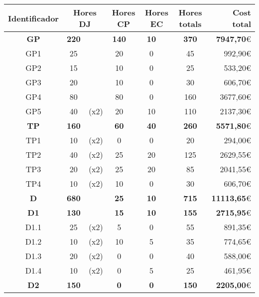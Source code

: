 \begin{table}[H]
    \centering
    \begin{tabular}{|c|cc|cc|cc|c|r|}
    \hline
    \textbf{Identificador} & \multicolumn{2}{c|}{\textbf{Hores DJ}} & \multicolumn{2}{c|}{\textbf{Hores CP}} & \multicolumn{2}{c|}{\textbf{Hores EC}} & \textbf{Hores totals}   & \textbf{Cost total}      \\ \hline
    \textbf{GP}	&	\textbf{220}	&	&	\textbf{140}	&	&	\textbf{10}	&	&	\textbf{370}	&	\textbf{7947,70}\euro	\\	\hline
    GP1	&	25	&	&	20	&	&	0	&	&	45	&	992,90\euro	\\	\hline
    GP2	&	15	&	&	10	&	&	0	&	&	25	&	533,20\euro	\\	\hline
    GP3	&	20	&	&	10	&	&	0	&	&	30	&	606,70\euro	\\	\hline
    GP4	&	80	&	&	80	&	&	0	&	&	160	&	3677,60\euro	\\	\hline
    GP5	&	40	&	{\footnotesize	(x2)}	&	20	&	&	10	&	&	110	&	2137,30\euro	\\	\hline
    \textbf{TP}	&	\textbf{160}	&	&	\textbf{60}	&	&	\textbf{40}	&	&	\textbf{260}	&	\textbf{5571,80}\euro	\\	\hline
    TP1	&	10	&	{\footnotesize	(x2)}	&	0	&	&	0	&	&	20	&	294,00\euro	\\	\hline
    TP2	&	40	&	{\footnotesize	(x2)}	&	25	&	&	20	&	&	125	&	2629,55\euro	\\	\hline
    TP3	&	20	&	{\footnotesize	(x2)}	&	25	&	&	20	&	&	85	&	2041,55\euro	\\	\hline
    TP4	&	10	&	{\footnotesize	(x2)}	&	10	&	&	0	&	&	30	&	606,70\euro	\\	\hline
    \textbf{D}	&	\textbf{680}	&	&	\textbf{25}	&	&	\textbf{10}	&	&	\textbf{715}	&	\textbf{11113,65}\euro	\\	\hline
    \textbf{D1}	&	\textbf{130}	&	&	\textbf{15}	&	&	\textbf{10}	&	&	\textbf{155}	&	\textbf{2715,95}\euro	\\	\hline
    D1.1	&	25	&	{\footnotesize	(x2)}	&	5	&	&	0	&	&	55	&	891,35\euro	\\	\hline
    D1.2	&	10	&	{\footnotesize	(x2)}	&	10	&	&	5	&	&	35	&	774,65\euro	\\	\hline
    D1.3	&	20	&	{\footnotesize	(x2)}	&	0	&	&	0	&	&	40	&	588,00\euro	\\	\hline
    D1.4	&	10	&	{\footnotesize	(x2)}	&	0	&	&	5	&	&	25	&	461,95\euro	\\	\hline
    \textbf{D2}	&	\textbf{150}	&	&	\textbf{0}	&	&	\textbf{0}	&	&	\textbf{150}	&	\textbf{2205,00}\euro	\\	\hline

\end{tabular}
\end{table}
